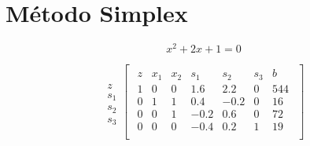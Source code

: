 \chapter{Método Simplex}

$$
x^2+2x + 1 = 0
$$

\begin{equation}
\begin{array}{c}
\\
z \\ 
s_1 \\
s_2 \\
s_3 
\end{array}
\begin{bmatrix}
\begin{array}{c|ccccc|c}
  z & x_1 & x_2 & s_1 & s_2 & s_3 & b \\ \hline
  1 & 0 & 0 & 1.6 & 2.2 & 0 & 544 \\ \hline
  0 & 1 & 1 & 0.4 & -0.2 & 0 & 16  \\
  0 & 0 & 1 & -0.2 & 0.6 & 0 & 72 \\
  0 & 0 & 0 & -0.4 & 0.2 & 1 & 19 \\
\end{array}
\end{bmatrix}
\end{equation}
